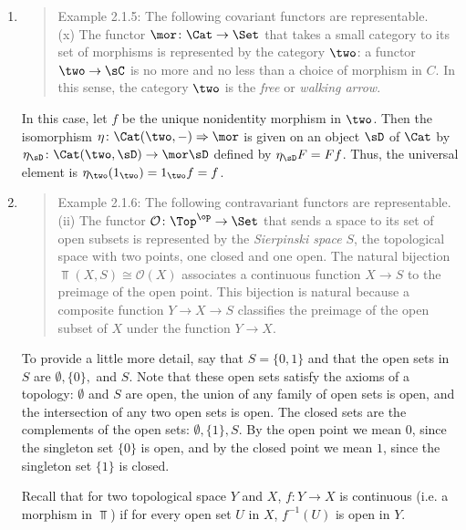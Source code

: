 \documentclass[main.tex]{subfiles}
\begin{document}
\begin{enumerate}
\item 
\begin{quote}
Example 2.1.5: The following covariant functors are representable.\\
(x) The functor $\mor\colon \Cat\rightarrow\Set$ that takes a small category to its set of morphisms is represented by the category $\two$: a functor $\two\rightarrow\sC$ is no more and no less than a choice of morphism in $C$. In this sense, the category $\two$ is the \emph{free} or \emph{walking arrow}.
\end{quote}

In this case, let $f$ be the unique nonidentity morphism in $\two$. Then the 
isomorphism $\eta\colon \Cat(\two,-)\Rightarrow\mor$ is given on an object 
$\sD$ of $\Cat$ by $\eta_\sD\colon \Cat(\two,\sD)\rightarrow\mor\sD$ defined by 
$\eta_\sD F=Ff$. Thus, the universal element is $\eta_\two(1_\two)=1_\two f=f$.

\item 
\begin{quote}
Example 2.1.6: The following contravariant functors are representable.\\
(ii) The functor ${\mathcal O}\colon \Top^\op\rightarrow\Set$ that sends a 
space to its set of open subsets is represented by the \emph{Sierpinski space} 
$S$, the topological space with two points, one closed and one open. The 
natural bijection $\Top(X,S)\cong{\mathcal O}(X)$ associates a continuous 
function $X\rightarrow S$ to the preimage of the open point. This bijection is 
natural because a composite function $Y\rightarrow X\rightarrow S$ classifies 
the preimage of the open subset of $X$ under the function $Y\rightarrow X$.
\end{quote}

To provide a little more detail, say that $S=\{0,1\}$ and that the open sets in 
$S$ are $\emptyset,\{0\},$ and $S$. Note that these open sets satisfy the axioms 
of a topology: $\emptyset$ and $S$ are open, the union of any family of open 
sets is open, and the intersection of any two open sets is open. The closed 
sets are the complements of the open sets: $\emptyset, \{1\},S$. By the open 
point we mean $0$, since the singleton set $\{0\}$ is open, and by the closed 
point we mean $1$, since the singleton set $\{1\}$ is closed.

Recall that for two topological space $Y$ and $X$, $f\colon Y\rightarrow X$ is continuous (i.e. a morphism in $\Top$) if for every open set $U$ in $X$, $f^{-1}(U)$ is open in $Y$. 


\end{enumerate}
\end{document}
